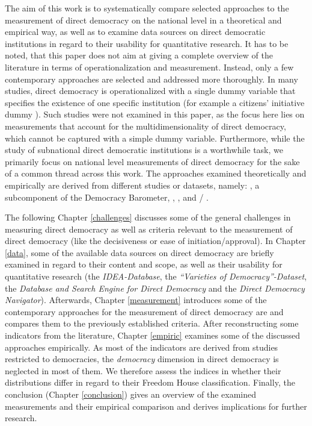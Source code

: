 \documentclass{systats}
\begin{document}
The aim of this work is to systematically compare selected approaches to the measurement of direct democracy on the national level in a theoretical and empirical way, as well as to examine data sources on direct democratic institutions in regard to their usability for quantitative research. It has to be noted, that this paper does not aim at giving a complete overview of the literature in terms of operationalization and measurement. Instead, only a few contemporary approaches are selected and addressed more thoroughly. In many studies, direct democracy is operationalized with a single dummy variable that specifies the existence of one specific institution (for example a citizens’ initiative dummy \citealp[as in][]{bernhardbuehlmann2014}). Such studies were not examined in this paper, as the focus here lies on measurements that account for the multidimensionality of direct democracy, which cannot be captured with a simple dummy variable. Furthermore, while the study of subnational direct democratic institutions is a worthwhile task, we primarily focus on national level measurements of direct democracy for the sake of a common thread across this work. The approaches examined theoretically and empirically are derived from different studies or datasets, namely: \citealp[][]{gherghina2016}, a subcomponent of the Democracy Barometer, \citealp[][]{peters2016}, \citealp[][]{fiorino2017}, and \citealp[][]{altman2017}/ \citealp[][]{coppedge2017data}.

The following Chapter \ref{challenges} discusses some of the general challenges in measuring direct democracy as well as criteria relevant to the measurement of direct democracy (like the decisiveness or ease of initiation/approval). In Chapter \ref{data}, some of the available data sources on direct democracy are briefly examined in regard to their content and scope, as well as their usability for quantitative research (the \textit{IDEA-Database}, the \textit{“Varieties of Democracy”-Dataset}, the \textit{Database and Search Engine for Direct Democracy} and the \textit{Direct Democracy Navigator}). Afterwards, Chapter \ref{measurement} introduces some of the contemporary approaches for the measurement of direct democracy are and compares them to the previously established criteria. After reconstructing some indicators from the literature, Chapter \ref{empiric} examines some of the discussed approaches empirically. As most of the indicators are derived from studies restricted to democracies, the \textit{democracy} dimension in direct democracy is neglected in most of them. We therefore assess the indices in whether their distributions differ in regard to their Freedom House classification. Finally, the conclusion (Chapter \ref{conclusion}) gives an overview of the examined measurements and their empirical comparison and derives implications for further research.
\end{document}
